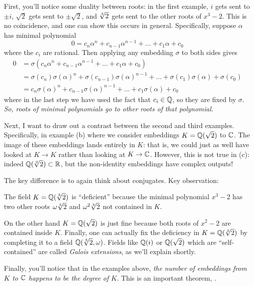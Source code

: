 \begin{itemize}
\ii
First, you'll notice some duality between roots: in the first example, $i$ gets sent to $\pm i$,
$\sqrt 2$ gets sent to $\pm \sqrt 2$, and $\sqrt[3]{2}$ gets sent to the other roots of $x^3-2$.
This is no coincidence, and one can show this occurs in general.
Specifically, suppose $\alpha$ has minimal polynomial
\[ 0 = c_n \alpha^n + c_{n-1} \alpha^{n-1} + \dots + c_1\alpha + c_0 \]
where the $c_i$ are rational.
Then applying any embedding $\sigma$ to both sides gives
\begin{align*}
	0 &= \sigma(c_n \alpha^n + c_{n-1} \alpha^{n-1} + \dots + c_1\alpha + c_0) \\
	&= \sigma(c_n) \sigma(\alpha)^n + \sigma(c_{n-1}) \sigma(\alpha)^{n-1}
	+ \dots + \sigma(c_1)\sigma(\alpha) + \sigma(c_0) \\
	&= c_n \sigma(\alpha)^n + c_{n-1} \sigma(\alpha)^{n-1} + \dots + c_1\sigma(\alpha) + c_0
\end{align*}
where in the last step we have used the fact that $c_i \in \mathbb Q$, so they are fixed by $\sigma$.
\emph{So, roots of minimal polynomials go to other roots of that polynomial.}

\ii
Next, I want to draw out a contrast between the second and third examples.
Specifically, in example (b) where we consider embeddings $K = \mathbb Q(\sqrt 2)$
to $\mathbb C$.  The image of these embeddings lands entirely in $K$: that is, we
could just as well have looked at $K \to K$ rather than looking at $K \to \mathbb C$.
However, this is not true in (c): indeed $\mathbb Q(\sqrt[3]{2}) \subset \mathbb R$,
but the non-identity embeddings have complex outputs!

The key difference is to again think about conjugates.
Key observation:
\begin{moral}
	The field $K = \mathbb Q(\sqrt[3]{2})$ is ``deficient'' because the minimal polynomial $x^3-2$
	has two other roots $\omega \sqrt[3]{2}$ and $\omega^2 \sqrt[3]{2}$ not contained in $K$.
\end{moral}
On the other hand $K = \mathbb Q(\sqrt 2)$ is just fine because both roots of $x^2-2$ are contained inside $K$.
Finally, one can actually fix the deficiency in $K = \mathbb Q(\sqrt[3]{2})$ by completing it to a field $\mathbb Q(\sqrt[3]{2}, \omega)$.
Fields like $\mathbb Q(i)$ or $\mathbb Q(\sqrt 2)$ which are ``self-contained'' are called
\emph{Galois extensions}, as we'll explain shortly.

\ii
Finally, you'll notice that in the examples above, \emph{the number of embeddings from $K$ to $\mathbb C$
happens to be the degree of $K$}.
This is an important theorem, .
\end{itemize}

